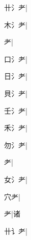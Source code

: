 \begin{multicols}{2}
{{\cjk{}卄{\cnxHanaA{}氵}耂}\mktsJzrVerticalBar{}{\cjk{}{\cnsym{}　}{\cnsym{}　}{\cnsym{}　}}|{}\par
{\cjk{}木{\cnxHanaA{}氵}耂}\mktsJzrVerticalBar{}{\cjk{}{\cnsym{}　}{\cnsym{}　}{\cnsym{}　}}|{}\par
{耂}\mktsJzrVerticalBar{}{\cjk{}{\cnsym{}　}{\cnsym{}　}{\cnsym{}　}}|{}\par
{\cjk{}口{\cnxHanaA{}氵}耂}\mktsJzrVerticalBar{}{\cjk{}{\cnsym{}　}{\cnsym{}　}{\cnsym{}　}}|{}\par
{\cjk{}日{\cnxHanaA{}氵}耂}\mktsJzrVerticalBar{}{\cjk{}{\cnsym{}　}{\cnsym{}　}{\cnsym{}　}}|{}\par
{\cjk{}貝{\cnxHanaA{}氵}耂}\mktsJzrVerticalBar{}{\cjk{}{\cnsym{}　}{\cnsym{}　}{\cnsym{}　}}|{}\par
{\cjk{}壬{\cnxHanaA{}氵}耂}|{}\par
{\cjk{}禾{\cnxHanaA{}氵}耂}\mktsJzrVerticalBar{}{\cjk{}{\cnsym{}　}{\cnsym{}　}{\cnsym{}　}}|{}\par
{\cjk{}勿{\cnxHanaA{}氵}耂}\mktsJzrVerticalBar{}{\cjk{}{\cnsym{}　}{\cnsym{}　}{\cnsym{}　}}|{}\par
{耂}\mktsJzrVerticalBar{}{\cjk{}{\cnsym{}　}{\cnsym{}　}{\cnsym{}　}}|{}\par
{\cjk{}女{\cnxHanaA{}氵}耂}\mktsJzrVerticalBar{}{\cjk{}{\cnsym{}　}{\cnsym{}　}{\cnsym{}　}}|{}\par
{\cjk{}{\cnsym{}　}穴耂}\mktsJzrVerticalBar{}{\cjk{}{\cnsym{}　}{\cnsym{}　}{\cnsym{}　}}|{}\par
{耂}\mktsJzrVerticalBar{}{\cjk{}{\cnsym{}　}{\cnsym{}　}{\cnsym{}　}}|{\cjk{}诸}\par
{\cjk{}卄{讠}耂}\mktsJzrVerticalBar{}{\cjk{}{\cnsym{}　}{\cnsym{}　}{\cnsym{}　}}|{}\par
}
\end{multicols}

